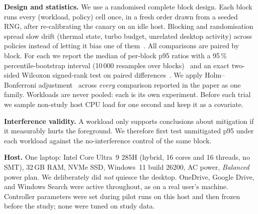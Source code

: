 \textbf{Design and statistics.} We use a randomised complete block design. Each block runs every (workload, policy) cell once, in a fresh order drawn from a seeded RNG, after re-calibrating the canary on an idle host. Blocking and randomisation spread slow drift (thermal state, turbo budget, unrelated desktop activity) across policies instead of letting it bias one of them~\cite{georges2007rigorous,kalibera2013rigorous}. All comparisons are paired by block. For each we report the median of per-block p95 ratios with a 95\,\% percentile-bootstrap interval (10\,000 resamples over blocks)~\cite{efron1993bootstrap} and an exact two-sided Wilcoxon signed-rank test on paired differences~\cite{wilcoxon1945}. We apply Holm--Bonferroni adjustment~\cite{holm1979} across \emph{every} comparison reported in the paper as one family. Workloads are never pooled: each is its own experiment. Before each trial we sample non-study host CPU load for one second and keep it as a covariate.

\textbf{Interference validity.} A workload only supports conclusions about mitigation if it measurably hurts the foreground. We therefore first test unmitigated p95 under each workload against the no-interference control of the same block.

\textbf{Host.} One laptop: Intel Core Ultra~9 285H (hybrid, 16 cores and 16 threads, no SMT), 32\,GB RAM, NVMe SSD, Windows~11 build 26200, AC power, \emph{Balanced} power plan. We deliberately did \emph{not} quiesce the desktop. OneDrive, Google Drive, and Windows Search were active throughout, as on a real user's machine. Controller parameters were set during pilot runs on this host and then frozen before the study; none were tuned on study data.
